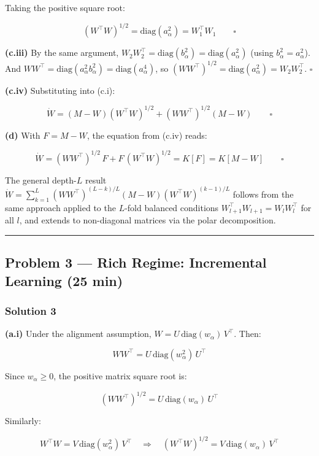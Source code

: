 \documentclass[
]{article}
\begin{document}
Taking the positive square root:

\[(W^\top W)^{1/2} = \text{diag}(a_\alpha^2) = W_1^\top W_1 \qquad \square\]

\textbf{(c.iii)} By the same argument,
\(W_2 W_2^\top = \text{diag}(b_\alpha^2) = \text{diag}(a_\alpha^2)\)
(using \(b_\alpha^2 = a_\alpha^2\)). And
\(WW^\top = \text{diag}(a_\alpha^2 b_\alpha^2) = \text{diag}(a_\alpha^4)\),
so \((WW^\top)^{1/2} = \text{diag}(a_\alpha^2) = W_2 W_2^\top\).
\(\square\)

\textbf{(c.iv)} Substituting into (c.i):

\[\dot{W} = (M - W)(W^\top W)^{1/2} + (WW^\top)^{1/2}(M - W) \qquad \square\]

\textbf{(d)} With \(F = M - W\), the equation from (c.iv) reads:

\[\dot{W} = (WW^\top)^{1/2}\,F + F\,(W^\top W)^{1/2} = K[F] = K[M - W] \qquad \square\]

The general depth-\(L\) result
\(\dot{W} = \sum_{k=1}^{L}(WW^\top)^{(L-k)/L}(M-W)(W^\top W)^{(k-1)/L}\)
follows from the same approach applied to the \(L\)-fold balanced
conditions \(W_{l+1}^\top W_{l+1} = W_l W_l^\top\) for all \(l\), and
extends to non-diagonal matrices via the polar decomposition.

\begin{center}\rule{0.5\linewidth}{0.5pt}\end{center}

\subsection{Problem 3 --- Rich Regime: Incremental Learning (25
min)}\label{problem-3-rich-regime-incremental-learning-25-min}

\subsubsection{Solution 3}\label{solution-3}

\textbf{(a.i)} Under the alignment assumption,
\(W = U\,\text{diag}(w_\alpha)\,V^\top\). Then:

\[WW^\top = U\,\text{diag}(w_\alpha^2)\,U^\top\]

Since \(w_\alpha \geq 0\), the positive matrix square root is:

\[(WW^\top)^{1/2} = U\,\text{diag}(w_\alpha)\,U^\top\]

Similarly:

\[W^\top W = V\,\text{diag}(w_\alpha^2)\,V^\top \quad \Longrightarrow \quad (W^\top W)^{1/2} = V\,\text{diag}(w_\alpha)\,V^\top\]
\end{document}
